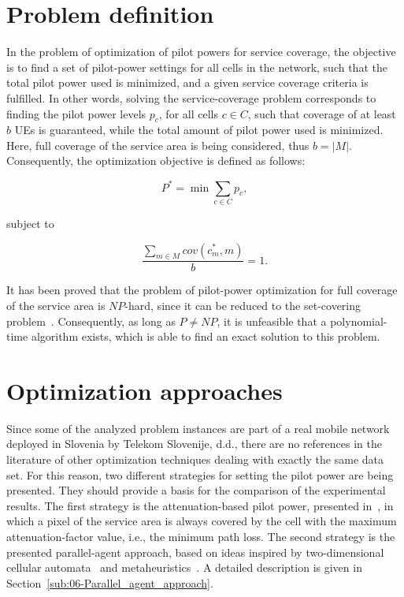 \section{Problem definition}

In the problem of optimization of pilot powers for service coverage,
the objective is to find a set of pilot-power settings for all cells
in the network, such that the total pilot power used is minimized,
and a given service coverage criteria is fulfilled. In other words,
solving the service-coverage problem corresponds to finding the pilot
power levels $p_{c}$, for all cells $c\in C$, such that coverage
of at least $b$ UEs is guaranteed, while the total amount of pilot
power used is minimized. Here, full coverage of the service area is
being considered, thus $b=\vert M\vert$. Consequently, the optimization
objective is defined as follows:

\begin{equation}
P^{*}=\min\sum_{c\in C}p_{c},\label{eq:06-Objective_function}
\end{equation}


\noindent subject to

\begin{equation}
\frac{\sum_{m\in M}cov(c_{m}^{*},m)}{b}=1.\label{eq:06-Coverage_constraint}
\end{equation}


\bigskip{}


It has been proved that the problem of pilot-power optimization for
full coverage of the service area is $NP$-hard, since it can be reduced
to the set-covering problem~\cite{Varbrand_Mathematical.programming.approach:2003}.
Consequently, as long as $P\neq NP$, it is unfeasible that a polynomial-time
algorithm exists, which is able to find an exact solution to this
problem.


\section{Optimization approaches \label{sec:06-Optimization-approaches}}

Since some of the analyzed problem instances are part of a real mobile
network deployed in Slovenia by Telekom Slovenije, d.d., there are
no references in the literature of other optimization techniques dealing
with exactly the same data set. For this reason, two different strategies
for setting the pilot power are being presented. They should provide
a basis for the comparison of the experimental results. The first
strategy is the attenuation-based pilot power, presented in~\cite{Siomina_Pilot.power.optimization:2004},
in which a pixel of the service area is always covered by the cell
with the maximum attenuation-factor value, i.e., the minimum path
loss. The second strategy is the presented parallel-agent approach,
based on ideas inspired by two-dimensional cellular automata~\cite{Sarkar_Cellular.automata.history:2000}
and metaheuristics~\cite{Talbi_Metaheuristics:2009}. A detailed
description is given in Section~\ref{sub:06-Parallel_agent_approach}.

